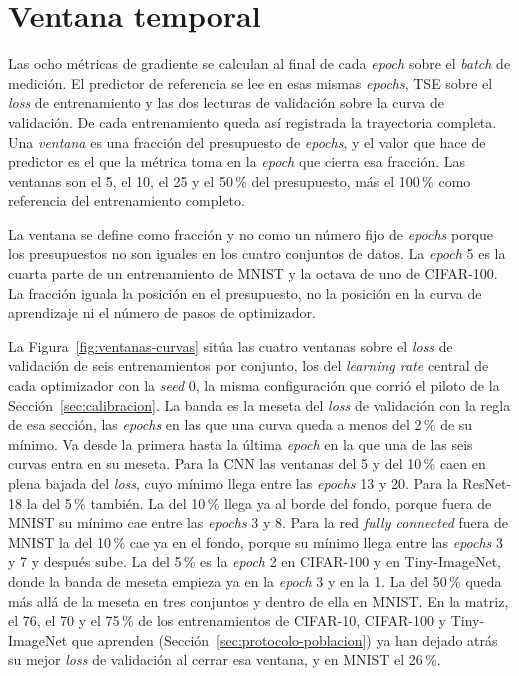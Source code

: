\section{Ventana temporal}
\label{sec:ventana}

Las ocho métricas de gradiente se calculan al final de cada \emph{epoch} sobre el \emph{batch} de medición. El predictor de referencia se lee en esas mismas \emph{epochs}, TSE sobre el \emph{loss} de entrenamiento y las dos lecturas de validación sobre la curva de validación. De cada entrenamiento queda así registrada la trayectoria completa. Una \emph{ventana} es una fracción del presupuesto de \emph{epochs}, y el valor que hace de predictor es el que la métrica toma en la \emph{epoch} que cierra esa fracción. Las ventanas son el 5, el 10, el 25 y el 50\,\% del presupuesto, más el 100\,\% como referencia del entrenamiento completo.

La ventana se define como fracción y no como un número fijo de \emph{epochs} porque los presupuestos no son iguales en los cuatro conjuntos de datos. La \emph{epoch} 5 es la cuarta parte de un entrenamiento de MNIST y la octava de uno de CIFAR-100. La fracción iguala la posición en el presupuesto, no la posición en la curva de aprendizaje ni el número de pasos de optimizador.

La Figura~\ref{fig:ventanas-curvas} sitúa las cuatro ventanas sobre el \emph{loss} de validación de seis entrenamientos por conjunto, los del \emph{learning rate} central de cada optimizador con la \emph{seed} 0, la misma configuración que corrió el piloto de la Sección~\ref{sec:calibracion}. La banda es la meseta del \emph{loss} de validación con la regla de esa sección, las \emph{epochs} en las que una curva queda a menos del 2\,\% de su mínimo. Va desde la primera hasta la última \emph{epoch} en la que una de las seis curvas entra en su meseta. Para la CNN las ventanas del 5 y del 10\,\% caen en plena bajada del \emph{loss}, cuyo mínimo llega entre las \emph{epochs} 13 y 20. Para la ResNet-18 la del 5\,\% también. La del 10\,\% llega ya al borde del fondo, porque fuera de MNIST su mínimo cae entre las \emph{epochs} 3 y 8. Para la red \emph{fully connected} fuera de MNIST la del 10\,\% cae ya en el fondo, porque su mínimo llega entre las \emph{epochs} 3 y 7 y después sube. La del 5\,\% es la \emph{epoch} 2 en CIFAR-100 y en Tiny-ImageNet, donde la banda de meseta empieza ya en la \emph{epoch} 3 y en la 1. La del 50\,\% queda más allá de la meseta en tres conjuntos y dentro de ella en MNIST. En la matriz, el 76, el 70 y el 75\,\% de los entrenamientos de CIFAR-10, CIFAR-100 y Tiny-ImageNet que aprenden (Sección~\ref{sec:protocolo-poblacion}) ya han dejado atrás su mejor \emph{loss} de validación al cerrar esa ventana, y en MNIST el 26\,\%.

